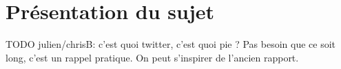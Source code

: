 
\section{Présentation du sujet}

TODO julien/chrisB: c'est quoi twitter, c'est quoi pie ? Pas besoin que ce soit long, c'est un rappel pratique. On peut s'inspirer de l'ancien rapport.

